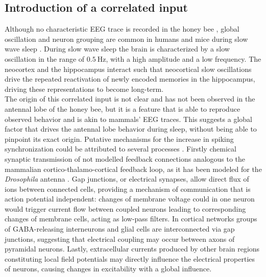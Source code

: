   \subsection{Introduction of a correlated input}
  Although no characteristic EEG trace is recorded in the honey bee \cite{sleep-mammals}, global oscillation and neuron grouping are common in humans and mice during slow wave sleep \cite{sws}.
  During slow wave sleep the brain is characterized by a slow oscillation in the range of $\SI{0.5}{\hertz}$, with a high amplitude and a low frequency.
  The neocortex and the hippocampus interact such that neocortical slow oscillations drive the repeated reactivation of newly encoded memories in the hippocampus, driving these representations to become long-term.\\
  The origin of this correlated input is not clear and has not been observed in the antennal lobe of the honey bee, but it is a feature that is able to reproduce observed behavior and is akin to mammals' EEG traces.
  This suggests a global factor that drives the antennal lobe behavior during sleep, without being able to pinpoint its exact origin.
  Putative mechanisms for the increase in spiking synchronization could be attributed to several processes \cite{synchronization-processes}.
  Firstly chemical synaptic transmission of not modelled feedback connections analogous to the mammalian cortico-thalamo-cortical feedback loop, as it has been modeled for the \textit{Drosophila} antenna \cite{model-with-feedback}.
  Gap junctions, or electrical synapses, allow direct flux of ions between connected cells, providing a mechanism of communication that is action potential independent: changes of membrane voltage could in one neuron would trigger current flow between coupled neurons leading to corresponding changes of membrane cells, acting as low-pass filters.
  In cortical networks groups of GABA-releasing interneurons and glial cells are interconnected via gap junctions, suggesting that electrical coupling may occur between axons of pyramidal neurons.
  Lastly, extracellular currents produced by other brain regions constituting local field potentials may directly influence the electrical properties of neurons, causing changes in excitability with a global influence.
